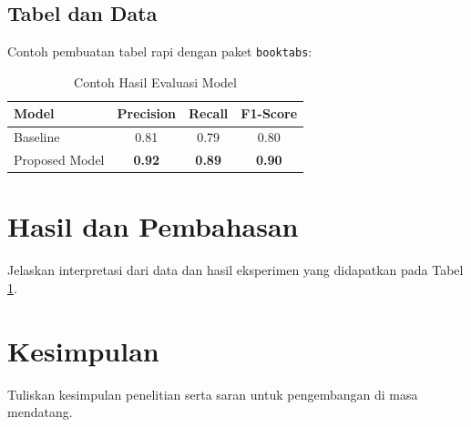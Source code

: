 \documentclass[12pt,a4paper]{article}
\begin{document}
\subsection{Tabel dan Data}
Contoh pembuatan tabel rapi dengan paket \texttt{booktabs}:
\begin{table}[htbp]
    \centering
    \caption{Contoh Hasil Evaluasi Model}
    \label{tab:evaluasi}
    \begin{tabular}{lccc}
        \toprule
        \textbf{Model} & \textbf{Precision} & \textbf{Recall} & \textbf{F1-Score} \\
        \midrule
        Baseline       & 0.81               & 0.79            & 0.80              \\
        Proposed Model & \textbf{0.92}      & \textbf{0.89}   & \textbf{0.90}     \\
        \bottomrule
    \end{tabular}
\end{table}

\section{Hasil dan Pembahasan}
Jelaskan interpretasi dari data dan hasil eksperimen yang didapatkan pada Tabel \ref{tab:evaluasi}.

\section{Kesimpulan}
Tuliskan kesimpulan penelitian serta saran untuk pengembangan di masa mendatang.



\end{document}
